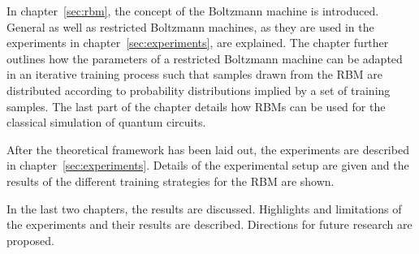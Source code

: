 In chapter~\ref{sec:rbm}, the concept of the Boltzmann machine is introduced. General as well as restricted 
Boltzmann machines, as they are used in the experiments in chapter~\ref{sec:experiments}, are explained. The chapter further 
outlines how the parameters of a restricted Boltzmann machine can be adapted in an iterative 
training process such that samples drawn from the RBM are distributed according to probability 
distributions implied by a set of training samples. The last part of the chapter details how 
RBMs can be used for the classical simulation of quantum circuits.

After the theoretical framework has been laid out, the experiments are described in chapter~\ref{sec:experiments}. Details of 
the experimental setup are given and the results of the different training strategies for the 
RBM are shown.

In the last two chapters, the results are discussed. Highlights and limitations of the 
experiments and their results are described. Directions for future research are proposed.
